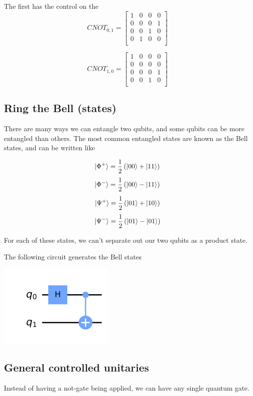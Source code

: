 \documentclass{book}
\begin{document}
The first has the control on the 
$$
CNOT_{0, 1} = \begin{bmatrix} 1 & 0 & 0 & 0 \\
0 & 0 & 0 & 1 \\
0 & 0 & 1 & 0 \\
0 & 1 & 0 & 0 \\
\end{bmatrix}
$$

$$
CNOT_{1, 0} = \begin{bmatrix} 1 & 0 & 0 & 0 \\
0 & 0 & 0 & 0 \\
0 & 0 & 0 & 1 \\
0 & 0 & 1 & 0 \\
\end{bmatrix}
$$


\subsection{ Ring the Bell (states)}


There are many ways we can entangle two qubits, and some qubits can be more entangled than others. The most common entangled states are known as the Bell states, and can be written like

$$ \ket{\Phi^+} = \frac{1}{2} \left( \ket{00} + \ket{11} \right) $$
$$ \ket{\Phi^-} = \frac{1}{2} \left( \ket{00} - \ket{11} \right) $$
$$ \ket{\Psi^+} = \frac{1}{2} \left( \ket{01} + \ket{10} \right) $$
$$ \ket{\Psi^-} = \frac{1}{2} \left( \ket{01} - \ket{01} \right) $$

For each of these states, we can't separate out our two qubits as a product state. 


The following circuit generates the Bell states

\includegraphics{Chapters/Images/Bell_State_circuit.png}


\subsection{General controlled unitaries }

Instead of having a not-gate being applied, we can have any single quantum gate. 
\end{document}
